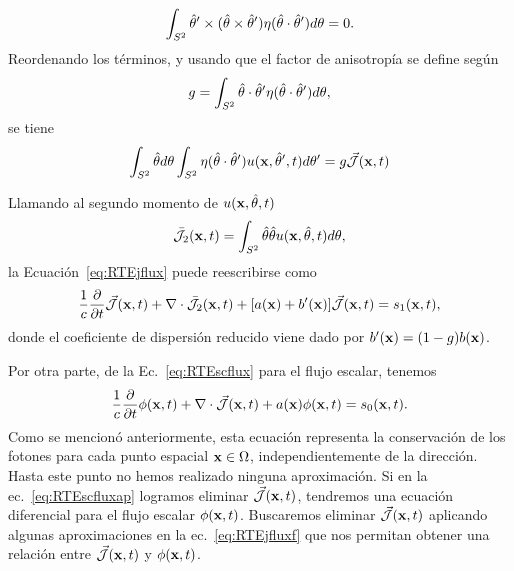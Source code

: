 \begin{equation}
\begin{split}
\begin{aligned}
\int_{S^2}  \hat{\theta}' \times(\hat{\theta} \times \hat{\theta}') \eta(\hat{\theta} \cdot \hat{\theta}') d\theta =0.
\end{aligned}
\end{split}
\label{eq:RTEjint2}
\end{equation}
Reordenando los términos, y usando que
el factor de anisotropía se define según
\begin{equation}
g=\int_{S^2} \hat{\theta} \cdot \hat{\theta}' \eta(\hat{\theta} \cdot \hat{\theta}') d\theta,
\label{eq:gnorm}
\end{equation}
se tiene 
\begin{equation}
\begin{split}
\begin{aligned}
\int_{S^2} \hat{\theta} d\theta \int_{S^2} \eta(\hat{\theta} \cdot \hat{\theta}')  u(\mathbf{x},\hat{\theta}',t) d\theta' 
=g \vec{ \mathcal{J}}(\mathbf{x},t)
\end{aligned}
\end{split}
\label{eq:RTEjint3}
\end{equation}

Llamando al segundo momento de $u(\mathbf{x},\hat{\theta},t)$
\begin{equation}
\bar{\mathcal{J}}_2(\mathbf{x},t)=\int_{S^2} \hat{\theta} \hat{\theta} u(\mathbf{x},\hat{\theta},t) d\theta,
\label{eq:RTEjflux2}
\end{equation}
la Ecuación~\eqref{eq:RTEjflux} puede reescribirse como
\begin{equation}
\begin{split}
\begin{aligned}
\frac{1}{c}\frac{\partial}{\partial t} \vec{ \mathcal{J}}(\mathbf{x},t)+\nabla \cdot \bar{\mathcal{J}}_2(\mathbf{x},t)+[a(\mathbf{x})+b'(\mathbf{x})]\vec{ \mathcal{J}}(\mathbf{x},t)=s_1(\mathbf{x},t),
\end{aligned}
\end{split}
\label{eq:RTEjfluxf}
\end{equation}
donde el coeficiente de dispersión reducido viene dado por $b'(\mathbf{x})=(1-g)b(\mathbf{x})$.

Por otra parte, de la Ec.~\eqref{eq:RTEscflux} para el flujo escalar, tenemos
\begin{equation}
\frac{1}{c}\frac{\partial}{\partial t} \phi(\mathbf{x},t)+\nabla \cdot \vec{ \mathcal{J}}(\mathbf{x},t)
+a(\mathbf{x})\phi(\mathbf{x},t)=s_0(\mathbf{x},t).
\label{eq:RTEscfluxap}
\end{equation}
Como se mencionó anteriormente, esta ecuación representa la conservación 
de los fotones para cada punto espacial $\mathbf{x} \in \Omega$, independientemente 
de la dirección. Hasta este punto no hemos realizado ninguna aproximación. 
Si en la ec.~\eqref{eq:RTEscfluxap} logramos eliminar $\vec{ \mathcal{J}}(\mathbf{x},t)$, tendremos una ecuación diferencial 
para el flujo escalar $\phi(\mathbf{x},t)$. Buscaremos eliminar $\vec{ \mathcal{J}}(\mathbf{x},t)$ aplicando algunas aproximaciones en la ec.~\eqref{eq:RTEjfluxf} que nos permitan obtener una relación entre $\vec{ \mathcal{J}}(\mathbf{x},t)$ y $\phi(\mathbf{x},t)$.
